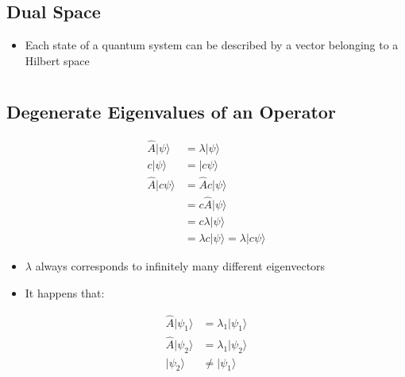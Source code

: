 \documentclass[a4paper,11pt,normalem]{article}
\begin{document}
\subsection{Dual Space}\label{dual-space}

\begin{itemize}
\item
  Each state of a quantum system can be described by a vector belonging
  to a Hilbert space
\end{itemize}

\section{}\label{lecture-6}

\subsection{Degenerate Eigenvalues of an Operator}\label{degenerate-eigenvalues-of-an-operator}

\[
    \begin{aligned}
    \hat{A}|\psi\rangle &= \lambda|\psi\rangle \\
    c|\psi\rangle &= |c\psi\rangle \\
    \hat{A}|c\psi\rangle &= \hat{A}c|\psi\rangle \\
    &= c\hat{A}|\psi\rangle \\
    &= c\lambda|\psi\rangle \\
    &= \lambda c|\psi\rangle = \lambda|c\psi\rangle
    \end{aligned}
\]

\begin{itemize}
\item
  \(\lambda\) always corresponds to infinitely many different
  eigenvectors
\item
  It happens that:
\end{itemize}

\[
    \begin{aligned}
    \hat{A}|\psi_1\rangle &= \lambda_1|\psi_1\rangle \\
    \hat{A}|\psi_2\rangle &= \lambda_1|\psi_2\rangle \\
    |\psi_2\rangle &\neq |\psi_1\rangle
    \end{aligned}
\]
\end{document}
